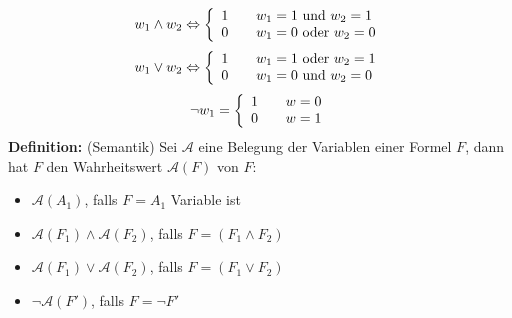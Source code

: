 \documentclass{scrartcl}
\begin{document}
\[ w_1 \wedge w_2 \Leftrightarrow \left\{
  \begin{array}{l l}
    1 & \quad \text{$w_1 = 1$ und $w_2 = 1$}\\
    0 & \quad \text{$w_1 = 0$ oder $w_2 = 0$}
  \end{array} \right.\]
\[ w_1 \vee w_2 \Leftrightarrow \left\{
  \begin{array}{l l}
    1 & \quad \text{$w_1 = 1$ oder $w_2 = 1$}\\
    0 & \quad \text{$w_1 = 0$ und $w_2 = 0$}
  \end{array} \right.\]
\[ \neg w_1 = \left\{
  \begin{array}{l l}
    1 & \quad \text{$w = 0$}\\
    0 & \quad \text{$w = 1$}
  \end{array} \right.\]
\textbf{Definition:} (Semantik) Sei $\mathcal{A}$ eine Belegung der Variablen einer Formel $F$, dann hat $F$ den Wahrheitswert $\mathcal{A}(F)$ von $F$:
\begin{itemize}
\item $\mathcal{A}(A_1)$, falls $F = A_1$ Variable ist
\item $\mathcal{A}(F_1) \wedge \mathcal{A}(F_2)$, falls $F = (F_1 \wedge F_2)$
\item $\mathcal{A}(F_1) \vee \mathcal{A}(F_2)$, falls $F = (F_1 \vee F_2)$
\item $\neg \mathcal{A}(F')$, falls $F = \neg F'$
\end{itemize}

\newpage
\end{document}
